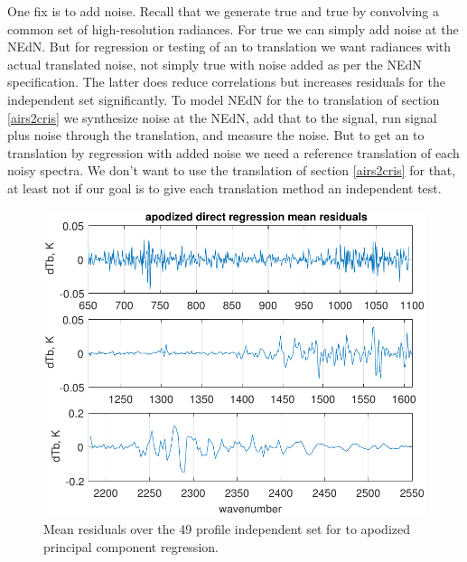 \documentclass[journal]{IEEEtran}
\begin{document}
One fix is to add noise.  Recall that we generate true {\airs} 
and true {\cris} by convolving a common set of high-resolution
radiances.  For true {\airs} we can simply add noise at the {\airs}
NEdN.  But for regression or testing of an {\airs} to {\cris}
translation we want {\cris} radiances with actual translated {\airs}
noise, not simply true {\cris} with noise added as per the {\cris}
NEdN specification.  The latter does reduce correlations but
increases residuals for the independent set significantly.
To model NEdN for the {\airs} to {\cris} translation of section
\ref{airs2cris} we synthesize noise at the {\airs} NEdN, add that 
to the signal, run signal plus noise through the translation, and
measure the noise.  But to get an {\airs} to {\cris} translation by
regression with added noise we need a reference translation of each
noisy {\airs} spectra.  We don't want to use the translation of
section \ref{airs2cris} for that, at least not if our goal is to
give each translation method an independent test.

\begin{figure} %
  \centering
  \includegraphics[width=\linewidth]{figures/ap_pc_regr.pdf}
  \caption{Mean residuals over the 49 profile independent set for
    {\airs} to apodized {\cris} principal component regression.}
  \label{dreg6}
\end{figure}
\end{document}
